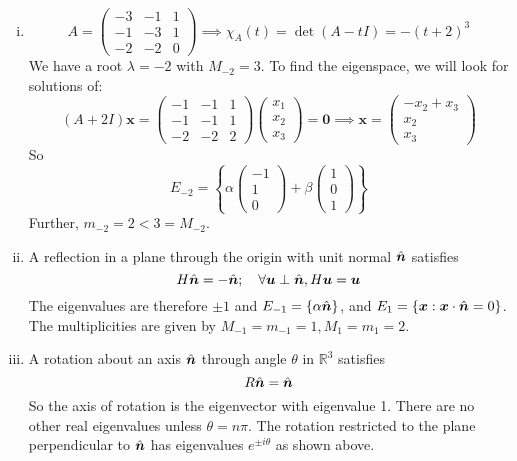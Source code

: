 \documentclass{article}
\begin{document}
\begin{enumerate}[(i)]
		\item
		\[ A = \begin{pmatrix}
			-3 & -1 & 1 \\ -1 & -3 & 1 \\ -2 & -2 & 0
		\end{pmatrix} \implies \chi_A(t) = \det(A - tI) = -(t + 2)^3 \]
		We have a root $\lambda = -2$ with $M_{-2} = 3$. To find the eigenspace, we will look for solutions of:
		\[ (A + 2I)\bm x = \begin{pmatrix}
			-1 & -1 & 1 \\ -1 & -1 & 1 \\ -2 & -2 & 2
		\end{pmatrix} \begin{pmatrix}
			x_1 \\ x_2 \\ x_3
		\end{pmatrix} = \bm 0 \implies \bm x = \begin{pmatrix}
			-x_2 + x_3 \\ x_2 \\ x_3
		\end{pmatrix} \]
		So
		\[ E_{-2} = \left\{ \alpha\begin{pmatrix}
			-1 \\ 1 \\ 0
		\end{pmatrix} + \beta\begin{pmatrix}
			1 \\ 0 \\ 1
		\end{pmatrix} \right\} \]
		Further, $m_{-2} = 2 < 3 = M_{-2}$.

		\item A reflection in a plane through the origin with unit normal $\hat{\bm n}$ satisfies
		\[ H\hat{\bm n} = -\hat{\bm n};\quad \forall \bm u \perp \hat{\bm n}, H \bm u = \bm u \]
		The eigenvalues are therefore $\pm 1$ and $E_{-1} = \{ \alpha \hat{\bm n} \}$, and $E_1 = \{ \bm x: \bm x \cdot \hat{\bm n} = 0 \}$. The multiplicities are given by $M_{-1} = m_{-1} = 1, M_1 = m_1 = 2$.

		\item A rotation about an axis $\hat{\bm n}$ through angle $\theta$ in $\mathbb R^3$ satisfies
		\[ R\hat{\bm n} = \hat{\bm n} \]
		So the axis of rotation is the eigenvector with eigenvalue 1. There are no other real eigenvalues unless $\theta = n\pi$. The rotation restricted to the plane perpendicular to $\hat{\bm n}$ has eigenvalues $e^{\pm i \theta}$ as shown above.
	\end{enumerate}
\end{document}
